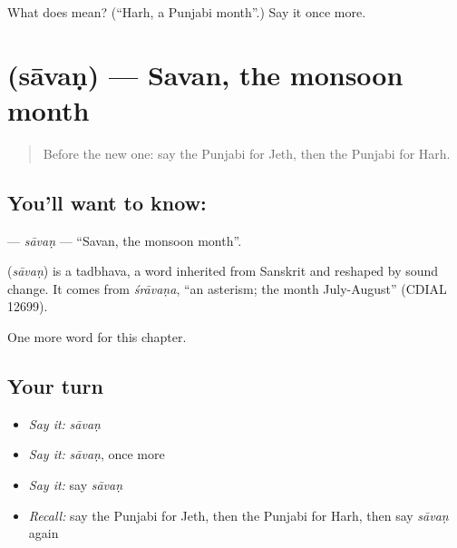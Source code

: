 \begin{tcolorbox}[breakable,colback=teal!4,colframe=teal!35!black,title={Before you move on}]
What does  mean? (\textquotedblleft{}Harh, a Punjabi month\textquotedblright{}.) Say it once more.
\end{tcolorbox}
\section[\texorpdfstring{\pa{ਸਾਵਣ} (sāvaṇ)}{ਸਾਵਣ (sāvaṇ)}]{ (sāvaṇ) — Savan, the monsoon month}

\label{lesson:PA-C104-savan}



\begin{quote}
Before the new one: say the Punjabi for Jeth, then the Punjabi for Harh.
\end{quote}

\subsection*{You'll want to know: }
\textbf{} — \emph{sāvaṇ} — \textquotedblleft{}Savan, the monsoon month\textquotedblright{}.

\begin{cousinweb}
\textbf{} (\emph{sāvaṇ}) is a tadbhava, a word inherited from Sanskrit and reshaped by sound change. It comes from \emph{śrāvaṇa}, \textquotedblleft{}an asterism; the month July-August\textquotedblright{} (CDIAL 12699).
\end{cousinweb}

\begin{grammarlens}[title={What you've built}]
One more word for this chapter.
\end{grammarlens}

\subsection*{Your turn}
\begin{itemize}
\raggedright
  \item \emph{Say it:} \emph{sāvaṇ}
  \item \emph{Say it:} \emph{sāvaṇ}, once more
  \item \emph{Say it:} say \emph{sāvaṇ}
  \item \emph{Recall:} say the Punjabi for Jeth, then the Punjabi for Harh, then say \emph{sāvaṇ} again
\end{itemize}

